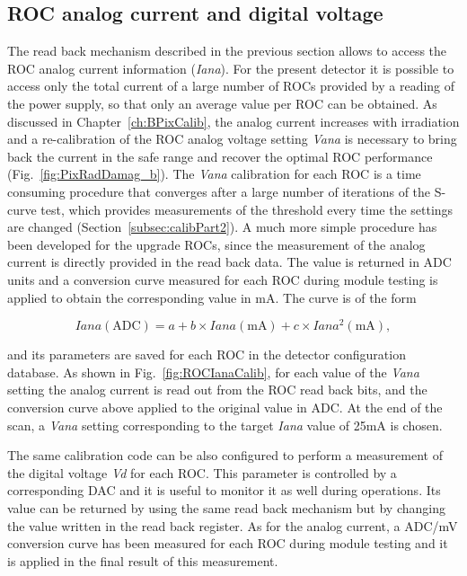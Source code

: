 \subsection{ROC analog current and digital voltage}

The read back mechanism described in the previous section allows to access the ROC analog current information (\textit{Iana}).
For the present detector it is possible to access only the total current of a large number of ROCs provided by a reading of the power supply, so that only an average value per ROC can be obtained.
As discussed in Chapter~\ref{ch:BPixCalib}, the analog current increases with irradiation and a re-calibration of the ROC analog voltage setting \textit{Vana}
is necessary to bring back the current in the safe range and recover the optimal ROC performance (Fig.~\ref{fig:PixRadDamag_b}).
The \textit{Vana} calibration for each ROC is a time consuming procedure that converges after a large number of iterations of the S-curve test,
which provides measurements of the threshold every time the settings are changed (Section~\ref{subsec:calibPart2}).
A much more simple procedure has been developed for the upgrade ROCs, since the measurement of the analog current is directly provided in the read back data.
The value is returned in ADC units and a conversion curve measured for each ROC during module testing is applied to obtain the corresponding value in mA.
The curve is of the form

\begin{equation}
Iana (\mathrm{ADC}) = a + b \times Iana (\mathrm{mA}) + c \times Iana^2 (\mathrm{mA}),
\end{equation}

and its parameters are saved for each ROC in the detector configuration database.
As shown in Fig.~\ref{fig:ROCIanaCalib}, for each value of the \textit{Vana} setting the analog current is read out from the ROC read back bits,
and the conversion curve above applied to the original value in ADC.
At the end of the scan, a \textit{Vana} setting corresponding to the target \textit{Iana} value of 25\unit{mA} is chosen.

The same calibration code can be also configured to perform a measurement of the digital voltage \textit{Vd} for each ROC.
This parameter is controlled by a corresponding DAC and it is useful to monitor it as well during operations.
Its value can be returned by using the same read back mechanism but by changing the value written in the read back register.
As for the analog current, a ADC/mV conversion curve has been measured for each ROC during module testing
and it is applied in the final result of this measurement.

